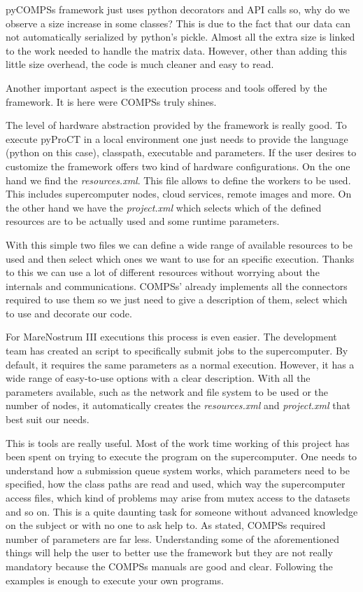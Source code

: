 pyCOMPSs framework just uses python decorators and API calls so, why do we observe a size increase in some classes? This is due to the fact that our data can not automatically serialized by python's pickle. Almost all the extra size is linked to the work needed to handle the matrix data. However, other than adding this little size overhead, the code is much cleaner and easy to read. 


Another important aspect is the execution process and tools offered by the framework. It is here were COMPSs truly shines. 

The level of hardware abstraction provided by the framework is really good. To execute pyProCT in a local environment one just needs to provide the language (python on this case), classpath, executable and parameters. If the user desires to customize the framework offers two kind of hardware configurations. On the one hand we find the \textit{resources.xml}. This file allows to define the workers to be used. This includes supercomputer nodes, cloud services, remote images and more. On the other hand we have the \textit{project.xml} which selects which of the defined resources are to be actually used and some runtime parameters. 

With this simple two files we can define a wide range of available resources to be used and then select which ones we want to use for an specific execution. Thanks to this we can use a lot of different resources without worrying about the internals and communications. COMPSs' already implements all the connectors required to use them so we just need to give a description of them, select which to use and decorate our code. 

For MareNostrum III executions this process is even easier. The development team has created an script to specifically submit jobs to the supercomputer. By default, it requires the same parameters as a normal execution. However, it has a wide range of easy-to-use options with a clear description. With all the parameters available, such as the network and file system to be used or the number of nodes, it automatically creates the \textit{resources.xml} and \textit{project.xml} that best suit our needs. 

This is tools are really useful. Most of the work time working of this project has been spent on trying to execute the program on the supercomputer. One needs to understand how a submission queue system works, which parameters need to be specified, how the class paths are read and used, which way the supercomputer access files, which kind of problems may arise from mutex access to the datasets and so on. This is a quite daunting task for someone without advanced knowledge on the subject or with no one to ask help to. As stated, COMPSs required number of parameters are far less. Understanding some of the aforementioned things will help the user to better use the framework but they are not really mandatory because the COMPSs manuals are good and clear. Following the examples is enough to execute your own programs. 




